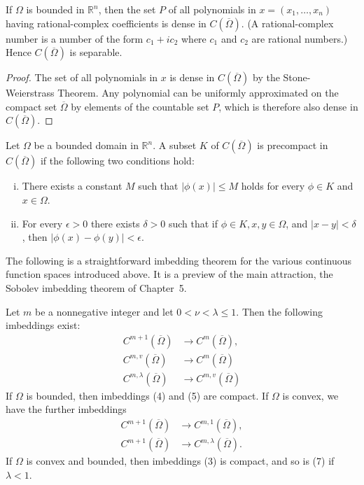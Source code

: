 \begin{corollary}
  If $\Omega$ is bounded in $\mathbb{R}^n$, then the set $P$ of all polynomials in $x=\left(x_1, \ldots, x_n\right)$ having rational-complex coefficients is dense in $C(\overline{\Omega})$. (A rational-complex number is a number of the form $c_1+i c_2$ where $c_1$ and $c_2$ are rational numbers.) Hence $C(\overline{\Omega})$ is separable.
\end{corollary}

\begin{proof}
  The set of all polynomials in $x$ is dense in $C(\overline{\Omega})$ by the Stone-Weierstrass Theorem. Any polynomial can be uniformly approximated on the compact set $\overline{\Omega}$ by elements of the countable set $P$, which is therefore also dense in $C(\overline{\Omega})$.
\end{proof}

\begin{theorem}
  Let $\Omega$ be a bounded domain in $\mathbb{R}^n$. A subset $K$ of $C(\overline{\Omega})$ is precompact in $C(\overline{\Omega})$ if the following two conditions hold:
  \begin{enumerate}[(i)]
    \item There exists a constant $M$ such that $|\phi(x)| \leq M$ holds for every $\phi \in K$ and $x \in \Omega$.
    \item For every $\epsilon>0$ there exists $\delta>0$ such that if $\phi \in K, x, y \in \Omega$, and $|x-y|<\delta$, then $|\phi(x)-\phi(y)|<\epsilon$.
  \end{enumerate}
\end{theorem}
The following is a straightforward imbedding theorem for the various continuous function spaces introduced above. It is a preview of the main attraction, the Sobolev imbedding theorem of Chapter~5.

\begin{theorem}
  Let $m$ be a nonnegative integer and let $0<\nu<\lambda \leq 1$. Then the following imbeddings exist:
  \begin{align}
    C^{m+1}(\overline{\Omega})  & \rightarrow C^m(\overline{\Omega}), \label{eq:1.3} \\
    C^{m, v}(\overline{\Omega}) & \rightarrow C^m(\overline{\Omega}) \label{eq:1.4} \\
    C^{m, \lambda}(\overline{\Omega}) & \rightarrow C^{m, v}(\overline{\Omega}) \label{eq:1.5}
  \end{align}
  If $\Omega$ is bounded, then imbeddings (4) and (5) are compact. If $\Omega$ is convex, we have the further imbeddings
  \begin{align}
    C^{m+1}(\overline{\Omega}) & \rightarrow C^{m, 1}(\overline{\Omega}), \label{eq:1.6} \\
    C^{m+1}(\overline{\Omega}) & \rightarrow C^{m, \lambda}(\overline{\Omega}). \label{eq:1.7}
  \end{align}
  If $\Omega$ is convex and bounded, then imbeddings (3) is compact, and so is (7) if $\lambda<1$.
\end{theorem}

